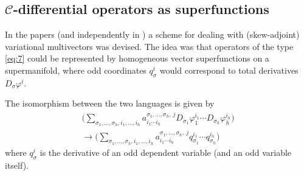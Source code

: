 \subsection[C-differential operators as superfunctions]{$\mathcal{C}$-differential operators as superfunctions}
\label{cdesec:mathc-diff-oper-odd}

In the papers \cite{IgoninVerbovetskyVitolo:2004,KerstenKrasilshchikVerboretsky:2004} (and independently in \cite{Getzler:2002}) a scheme for
dealing with (skew-adjoint) variational multivectors was devised. The idea was
that operators of the type \eqref{eq:7} could be represented by homogeneous
vector superfunctions on a supermanifold, where odd coordinates $q^i_\sigma$
would correspond to total derivatives $D_\sigma\varphi^i$. 

The isomorphism between the two languages is given by
\begin{equation}
  \label{eq:13}
  \begin{split}
  \Big(\sum_{\sigma_1,\ldots,\sigma_h, i_1,\ldots,
    i_h}a^{\sigma_1,\ldots,\sigma_h,\ j}_{i_1\cdots i_h} D_{\sigma_1}
  \varphi_1^{i_1}\cdots D_{\sigma_h}\varphi_h^{i_h}\Big) \\
  \longrightarrow
    \Big(\sum_{\sigma_1,\ldots,\sigma_h, i_1,\ldots,
      i_h}a^{\sigma_1,\ldots,\sigma_h,\ j}_{i_1\cdots i_h}
        q^{i_1}_{\sigma_1} \cdots q^{i_h}_{\sigma_h}\Big)
      \end{split}
    \end{equation}
where $q^i_\sigma$ is the derivative of an odd dependent variable (and an odd
variable itself).

